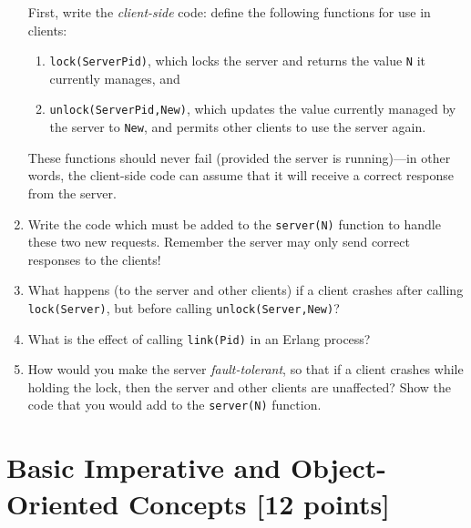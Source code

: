 \documentclass{article}
\begin{document}
\begin{enumerate}
First, write the {\em client-side} code: define the following
functions for use in clients:
\begin{enumerate}
\item
\verb!lock(ServerPid)!, which locks the server and returns the value
\verb!N! it currently manages, and
\item
\verb!unlock(ServerPid,New)!, which updates the value currently
managed by the server to \verb!New!, and permits other clients to use
the server again.
\end{enumerate}
These functions should never fail (provided the server is
running)---in other words, the client-side code can assume that it
will receive a correct response from the server.

\item
Write the code which must be added to the \verb!server(N)! function to
handle these two new requests. Remember the server may only send
correct responses to the clients!

\item
What happens (to the server and other clients) if a client crashes
after calling \verb!lock(Server)!, but before calling
\verb!unlock(Server,New)!?
\item
What is the effect of calling \verb!link(Pid)! in an Erlang process?
\item
How would you make the server {\em fault-tolerant}, so that if a
client crashes while holding the lock, then the server and other
clients are unaffected?  Show the code that you would add to the
\verb!server(N)! function.  


\end{enumerate}


\newpage

\section{Basic Imperative and Object-Oriented Concepts [12 points]}
\lstset{language=Java, columns=flexible}
\end{document}
